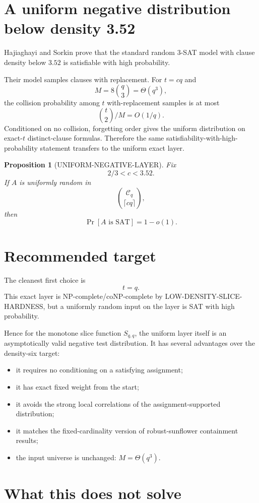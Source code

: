 \documentclass[11pt]{article}
\newtheorem{proposition}{Proposition}
\begin{document}
\section{A uniform negative distribution below density 3.52}

Hajiaghayi and Sorkin prove that the standard random 3-SAT model with clause density below \(3.52\) is satisfiable with high probability.

Their model samples clauses with replacement. For \(t=cq\) and
\[
M=8\binom q3=\Theta(q^3),
\]
the collision probability among \(t\) with-replacement samples is at most
\[
\binom t2/M=O(1/q).
\]
Conditioned on no collision, forgetting order gives the uniform distribution on exact-\(t\) distinct-clause formulas. Therefore the same satisfiability-with-high-probability statement transfers to the uniform exact layer.

\begin{proposition}[UNIFORM-NEGATIVE-LAYER]
Fix
\[
2/3<c<3.52.
\]
If \(A\) is uniformly random in
\[
\binom{\mathcal C_q}{\lceil cq\rceil},
\]
then
\[
\Pr[A\text{ is SAT}]=1-o(1).
\]
\end{proposition}

\section{Recommended target}

The cleanest first choice is
\[
\boxed{t=q}.
\]
This exact layer is NP-complete/coNP-complete by LOW-DENSITY-SLICE-HARDNESS, but a uniformly random input on the layer is SAT with high probability.

Hence for the monotone slice function \(S_{q,q}\), the uniform layer itself is an asymptotically valid negative test distribution. It has several advantages over the density-six target:
\begin{itemize}
\item[] it requires no conditioning on a satisfying assignment;
\item[] it has exact fixed weight from the start;
\item[] it avoids the strong local correlations of the assignment-supported distribution;
\item[] it matches the fixed-cardinality version of robust-sunflower containment results;
\item[] the input universe is unchanged: \(M=\Theta(q^3)\).
\end{itemize}

\section{What this does not solve}
\end{document}
